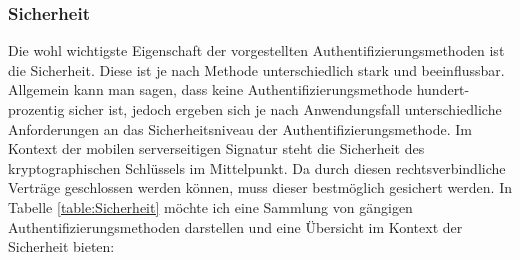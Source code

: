 \documentclass[11pt,a4paper,ngerman]{scrreprt}
\begin{document}
\subsubsection{Sicherheit}
Die wohl wichtigste Eigenschaft der vorgestellten Authentifizierungsmethoden ist die Sicherheit. Diese ist je nach Methode unterschiedlich stark und beeinflussbar. Allgemein kann man sagen, dass keine Authentifizierungsmethode hundert-prozentig sicher ist, jedoch ergeben sich je nach Anwendungsfall unterschiedliche Anforderungen an das Sicherheitsniveau der Authentifizierungsmethode. Im Kontext der mobilen serverseitigen Signatur steht die Sicherheit des kryptographischen Schlüssels im Mittelpunkt. Da durch diesen rechtsverbindliche Verträge geschlossen werden können, muss dieser bestmöglich gesichert werden. In Tabelle \ref{table:Sicherheit} möchte ich eine Sammlung von gängigen Authentifizierungsmethoden \cite{fido17} darstellen und eine Übersicht im Kontext der Sicherheit bieten:
\end{document}
